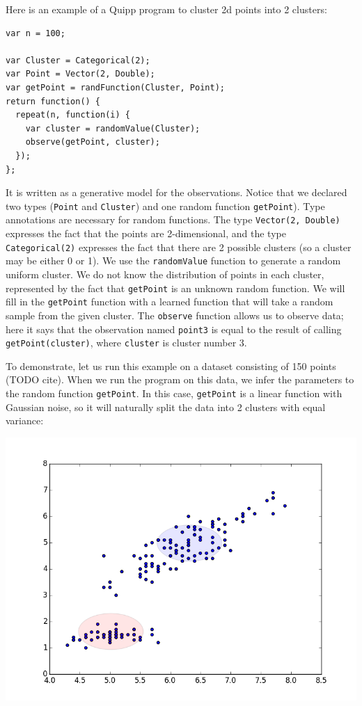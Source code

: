 \documentclass{article}
\begin{document}
  Here is an example of a Quipp program to cluster 2d points into 2 clusters:
  \begin{verbatim}
var n = 100;

var Cluster = Categorical(2);
var Point = Vector(2, Double);
var getPoint = randFunction(Cluster, Point);
return function() {
  repeat(n, function(i) {
    var cluster = randomValue(Cluster);
    observe(getPoint, cluster);
  });
};
  \end{verbatim}

  It is written as a generative model for the observations.  Notice that
  we declared two types (\texttt{Point} and \texttt{Cluster}) and one
  random function \texttt{getPoint}).  Type annotations are necessary for random
  functions.  The type \texttt{Vector(2, Double)} expresses the fact that the
  points are 2-dimensional, and the type \texttt{Categorical(2)} expresses the
  fact that there are 2 possible clusters (so a cluster may be either 0 or 1).
  We use the \texttt{randomValue} function to generate a random uniform cluster. We do not know
  the distribution of points in each cluster, represented by the fact that \texttt{getPoint}
  is an unknown random function.  We will fill in the
  \texttt{getPoint} function with a learned function that will take a random
  sample from the given cluster.  The \texttt{observe} function allows us to
  observe data; here it says that the observation named \texttt{point3} is equal
  to the result of calling \texttt{getPoint(cluster)}, where \texttt{cluster} is
  cluster number 3.


  To demonstrate, let us run this example on a dataset consisting of 150 points (TODO cite).  When we run the program on this data, we infer the parameters to the random function \texttt{getPoint}.
  In this case, \texttt{getPoint} is a linear function with Gaussian noise, so it will naturally
  split the data into 2 clusters with equal variance:
  \begin{center}
    \includegraphics[scale=0.5]{../plots/irisclusters_orig.png}
  \end{center}
\end{document}
